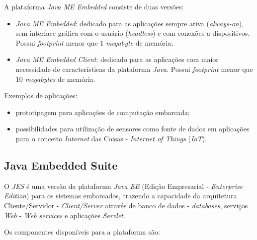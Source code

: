 A plataforma \textit{Java ME Embedded} consiste de duas versões:

\begin{itemize}

    \item \textit{Java ME Embedded}: dedicado para as aplicações sempre ativa
    (\textit{always-on}), sem interface gráfica com o usuário
    (\textit{headless}) e com conexões a dispositivos. Possui
    \textit{footprint} menor que 1 \textit{megabyte} de memória;

    \item \textit{Java ME Embedded Client}: dedicado para as aplicações com
    maior necessidade de características da plataforma \textit{Java}. Possui
    \textit{footprint} menor que 10 \textit{megabytes} de memória.

\end{itemize}

Exemplos de aplicações:

\begin{itemize}

    \item prototipagem para aplicações de computação embarcada;

    \item possibilidades para utilização de sensores como fonte de dados em
    aplicações para o conceito \textit{Internet} das Coisas -
    \textit{Internet of Things} (\textit{IoT}).

\end{itemize}

\subsection{Java Embedded Suite}

O \textit{JES} é uma versão da plataforma \textit{Java EE} (Edição Empresarial
- \textit{Enterprise Edition}) para os sistemas embarcados, trazendo a
capacidade da arquitetura Cliente/Servidor - \textit{Client/Server} através de
banco de dados - \textit{databases}, serviços \textit{Web} - \textit{Web
  services} e aplicações \textit{Servlet}.

Os componentes disponíveis para a plataforma são:

